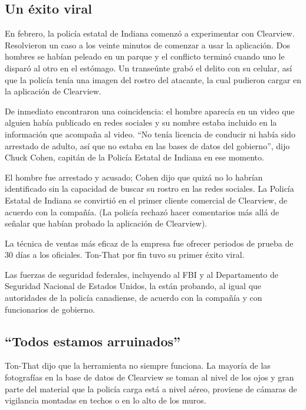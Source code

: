 \hypertarget{un-uxe9xito-viral}{%
\subsection{Un éxito viral}\label{un-uxe9xito-viral}}

En febrero, la policía estatal de Indiana comenzó a experimentar con
Clearview. Resolvieron un caso a los veinte minutos de comenzar a usar
la aplicación. Dos hombres se habían peleado en un parque y el conflicto
terminó cuando uno le disparó al otro en el estómago. Un transeúnte
grabó el delito con su celular, así que la policía tenía una imagen del
rostro del atacante, la cual pudieron cargar en la aplicación de
Clearview.

De inmediato encontraron una coincidencia: el hombre aparecía en un
video que alguien había publicado en redes sociales y su nombre estaba
incluido en la información que acompaña al video. ``No tenía licencia de
conducir ni había sido arrestado de adulto, así que no estaba en las
bases de datos del gobierno'', dijo Chuck Cohen, capitán de la Policía
Estatal de Indiana en ese momento.

El hombre fue arrestado y acusado; Cohen dijo que quizá no lo habrían
identificado sin la capacidad de buscar su rostro en las redes sociales.
La Policía Estatal de Indiana se convirtió en el primer cliente
comercial de Clearview, de acuerdo con la compañía. (La policía rechazó
hacer comentarios más allá de señalar que habían probado la aplicación
de Clearview).

La técnica de ventas más eficaz de la empresa fue ofrecer periodos de
prueba de 30 días a los oficiales. Ton-That por fin tuvo su primer éxito
viral.

Las fuerzas de seguridad federales, incluyendo al FBI y al Departamento
de Seguridad Nacional de Estados Unidos, la están probando, al igual que
autoridades de la policía canadiense, de acuerdo con la compañía y con
funcionarios de gobierno.

\hypertarget{todos-estamos-arruinados}{%
\subsection{``Todos estamos
arruinados''}\label{todos-estamos-arruinados}}

Ton-That dijo que la herramienta no siempre funciona. La mayoría de las
fotografías en la base de datos de Clearview se toman al nivel de los
ojos y gran parte del material que la policía carga está a nivel aéreo,
proviene de cámaras de vigilancia montadas en techos o en lo alto de los
muros.

